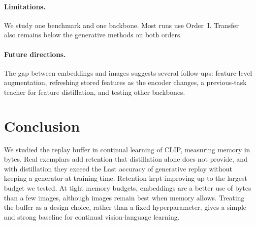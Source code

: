 \paragraph{Limitations.}
We study one benchmark and one backbone. Most runs use Order~I. Transfer also remains below the generative
methods on both orders.

\paragraph{Future directions.}
The gap between embeddings and images suggests several follow-ups: feature-level
augmentation, refreshing stored features as the encoder changes, a previous-task
teacher for feature distillation, and testing other backbones.

\section{Conclusion}
\label{sec:conclusion}
We studied the replay buffer in continual learning of CLIP, measuring memory in
bytes. Real exemplars add retention that distillation alone does not provide, and
with distillation they exceed the Last accuracy of generative replay without
keeping a generator at training time. Retention kept improving up to the largest
budget we tested. At tight memory budgets, embeddings are a better use of bytes
than a few images, although images remain best when memory allows. Treating the
buffer as a design choice, rather than a fixed hyperparameter, gives a simple and
strong baseline for continual vision-language learning.
